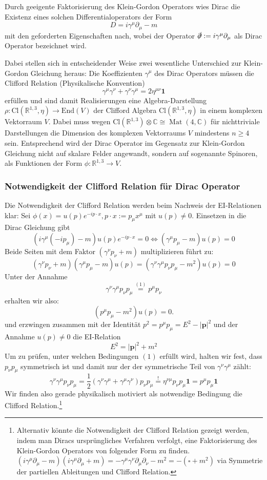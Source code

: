 \documentclass[10pt, letterpaper]{article}
\newcommand{\R}{\mathbb{R}}
\newcommand{\End}{\mathrm{End}}
\newcommand{\Cl}{\mathrm{Cl}}
\begin{document}
Durch geeigente Faktorisierung des Klein-Gordon Operators wies Dirac die Existenz eines solchen Differentialoperators der Form
$$D=i\gamma^\mu\partial_\mu -m$$
mit den geforderten Eigenschaften nach, wobei der Operator $\slashed{\partial}:=i\gamma^\mu\partial_\mu$ als Dirac Operator bezeichnet wird. 

Dabei stellen sich in entscheidender Weise zwei wesentliche Unterschied zur Klein-Gordon Gleichung heraus: Die Koeffizienten $\gamma^\mu$ des Dirac Operators müssen die Clifford Relation (Physikalische Konvention)
$$\gamma^\mu\gamma^\nu + \gamma^\nu \gamma^\mu= 2\eta^{\mu\nu}\mathbf{1}$$
erfüllen und sind damit Realisierungen eine Algebra-Darstellung $\rho: \Cl(\R^{1,3},\eta)\to \End(V)$ der Clifford Algebra $\Cl(\R^{1,3},\eta)$ in einem komplexen Vektorraum $V$. Dabei muss wegen $\mathrm{Cl}\left(\mathbb{R}^{1,3}\right) \otimes \mathbb{C} \cong \operatorname{Mat}(4, \mathbb{C})$ für nichttriviale Darstellungen die Dimension des komplexen Vektorraums $V$ mindestens $n\geq 4$ sein. Entsprechend wird der Dirac Operator im Gegensatz zur Klein-Gordon Gleichung nicht auf skalare Felder angewandt, sondern auf sogenannte Spinoren, als Funktionen der Form $\phi:\R^{1,3}\to V$. 

\subsubsection{Notwendigkeit der Clifford Relation für Dirac Operator}

Die Notwendigkeit der Clifford Relation werden beim Nachweis der EI-Relationen klar: Sei $\phi(x)=u(p)e^{-ip\cdot x}, p \cdot x:=p_\mu x^\mu$ mit $u(p)\neq 0$. Einsetzen in die Dirac Gleichung gibt
$$\left(i \gamma^\mu\left(-i p_\mu\right)-m\right) u(p) e^{-i p \cdot x}=0 \Longleftrightarrow\left(\gamma^\mu p_\mu-m\right) u(p)=0$$
Beide Seiten mit dem Faktor $\left(\gamma^\nu p_\nu+m\right)$ multiplizieren führt zu:
$$\left(\gamma^\nu p_\nu+m\right)\left(\gamma^\mu p_\mu-m\right) u(p)= (\gamma^\nu \gamma^\mu p_\nu p_\mu-m^2)u(p)=0$$
Unter der Annahme
$$\gamma^\nu \gamma^\mu p_\nu p_\mu \overset{(1)}{=} p^\mu p_\nu$$
erhalten wir also:
$$
\left(p^\mu p_\mu-m^2\right) u(p)=0 .
$$
und erzwingen zusammen mit der Identität $p^2=p^\mu p_\mu=E^2-|\mathbf{p}|^2$ und der Annahme $u(p)\neq 0$ die EI-Relation
$$E^2=|\mathbf{p}|^2+m^2$$
Um zu prüfen, unter welchen Bedingungen $(1)$ erfüllt wird, halten wir fest, dass $p_\nu p_\mu$ symmetrisch ist und damit nur der der symmetrische Teil von $\gamma^\nu \gamma^\mu$ zählt:
$$
\gamma^\nu \gamma^\mu p_\nu p_\mu=\frac{1}{2}\left(\gamma^\nu \gamma^\mu+\gamma^\mu \gamma^\nu\right) p_\nu p_\mu\overset{!}{=}\eta^{\nu \mu} p_\nu p_\mu \mathbf{1}=p^\mu p_\mu \mathbf{1}
$$
Wir finden also gerade physikalisch motiviert als notwendige Bedingung die Clifford Relation.\footnote{Alternativ könnte die Notwendigkeit der Clifford Relation gezeigt werden, indem man Diracs ursprüngliches Verfahren verfolgt, eine Faktorisierung des Klein-Gordon Operators von folgender Form zu finden. $(i\gamma^\mu\partial_\mu -m)(i\gamma^\mu\partial_\mu +m)=-\gamma^\mu\gamma^\nu\partial_\mu\partial_\nu -m^2=-(\square +m^2)$ via Symmetrie der partiellen Ableitungen und Clifford Relation.}
\end{document}
